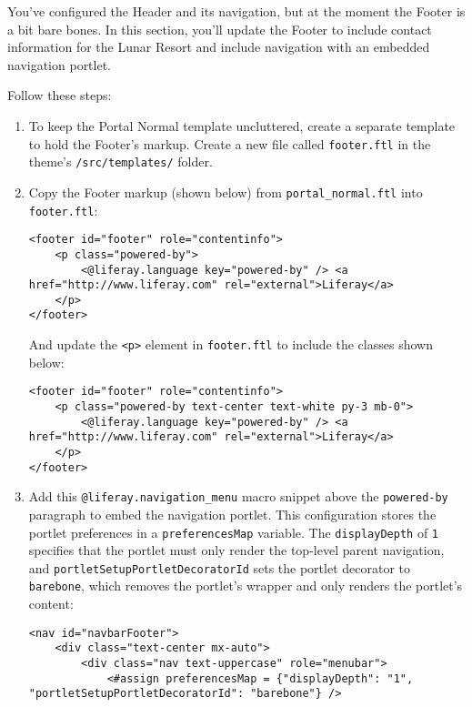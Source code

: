 You've configured the Header and its navigation, but at the moment the
Footer is a bit bare bones. In this section, you'll update the Footer to
include contact information for the Lunar Resort and include navigation
with an embedded navigation portlet.

Follow these steps:

\begin{enumerate}
\def\labelenumi{\arabic{enumi}.}
\item
  To keep the Portal Normal template uncluttered, create a separate
  template to hold the Footer's markup. Create a new file called
  \texttt{footer.ftl} in the theme's \texttt{/src/templates/} folder.
\item
  Copy the Footer markup (shown below) from \texttt{portal\_normal.ftl}
  into \texttt{footer.ftl}:

\begin{verbatim}
<footer id="footer" role="contentinfo">
    <p class="powered-by">
        <@liferay.language key="powered-by" /> <a href="http://www.liferay.com" rel="external">Liferay</a>
    </p>
</footer>
\end{verbatim}

  And update the \texttt{\textless{}p\textgreater{}} element in
  \texttt{footer.ftl} to include the classes shown below:

\begin{verbatim}
<footer id="footer" role="contentinfo">
    <p class="powered-by text-center text-white py-3 mb-0">
        <@liferay.language key="powered-by" /> <a href="http://www.liferay.com" rel="external">Liferay</a>
    </p>
</footer>
\end{verbatim}
\item
  Add this \texttt{@liferay.navigation\_menu} macro snippet above the
  \texttt{powered-by} paragraph to embed the navigation portlet. This
  configuration stores the portlet preferences in a
  \texttt{preferencesMap} variable. The \texttt{displayDepth} of
  \texttt{1} specifies that the portlet must only render the top-level
  parent navigation, and \texttt{portletSetupPortletDecoratorId} sets
  the portlet decorator to \texttt{barebone}, which removes the
  portlet's wrapper and only renders the portlet's content:

\begin{verbatim}
<nav id="navbarFooter">
    <div class="text-center mx-auto">
        <div class="nav text-uppercase" role="menubar">
            <#assign preferencesMap = {"displayDepth": "1", "portletSetupPortletDecoratorId": "barebone"} />


\end{verbatim}
\end{enumerate}
